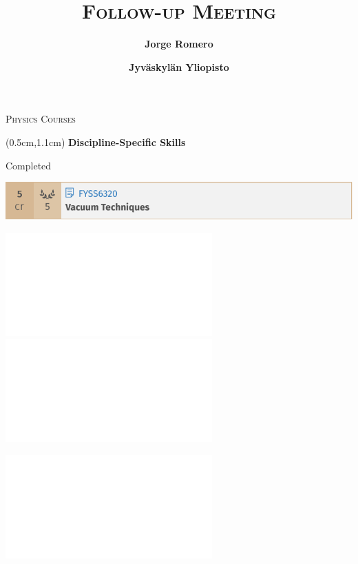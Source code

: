 \documentclass[9pt]{beamer}
\title{\textsc{Follow-up Meeting}}
\subtitle{\textbf{Jorge Romero}}
\author{\textbf{Jyväskylän Yliopisto}}
\institute{5. huhtikuuta 2021}
\begin{document}
\titlepage


\begin{frame}{\textsc{Physics Courses}}
    \begin{textblock*}{12cm}(0.5cm,1.1cm)
    {\Large \textbullet \textbf{Discipline-Specific Skills}}
        
    \vspace{1em}
    Completed

    {\centering\includegraphics[scale=0.75]{vacuum.pdf}}


     {\centering   \includegraphics<2->[scale=0.75]{accelerator.pdf}
        \includegraphics<2->[scale=0.75]{laser.pdf}}


    {  \includegraphics<3->[scale=0.75]{models.pdf}}

    \begin{center}
    \end{center}
    \end{textblock*}    
\end{frame}
\end{document}
